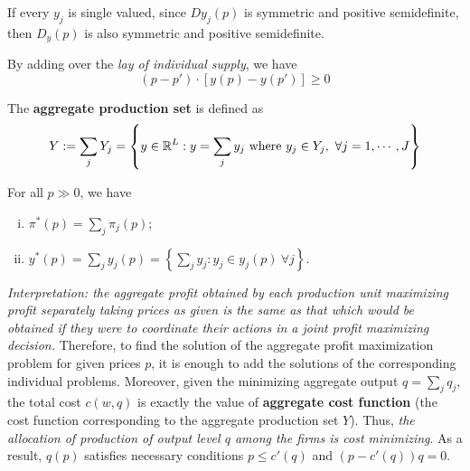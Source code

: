 \documentclass{report}
\begin{document}
	 		\begin{proposition}
	 			If every $y_j$ is single valued, since $Dy_j(p)$ is symmetric and positive semidefinite, then $D_y(p)$ is also symmetric and positive semidefinite.
	 		\end{proposition}
	 		
	 		\begin{proposition}
	 			By adding over the \emph{lay of individual supply}, we have 
	 			\begin{equation}
	 				(p-p') \cdot \left[y(p)-y(p')\right] \geq 0
	 			\end{equation}
	 		\end{proposition}
	 		
	 		\begin{definition}
	 			The \textbf{aggregate production set} is defined as
	 			\begin{equation}
	 				Y := \sum_j Y_j = \left\{y \in \mathbb{R}^L: y = \sum_j y_j \text{{ where }} y_j \in Y_j,\ \forall  j = 1, \cdots, J \right\}
	 			\end{equation}
	 		\end{definition}
	 		
	 		\begin{proposition}[5.E.1]
	 			For all $p \gg 0$, we have 
	 			\begin{enumerate}[(i)]
	 				\item $\pi^*(p) = \sum_j \pi_j (p)$;
	 				\item $y^*(p) = \sum_j y_j (p) = \left\{\sum_j y_j: y_j \in y_j(p)\ \forall j \right\}$.
	 			\end{enumerate}
	 			\emph{Interpretation: the aggregate profit obtained by each production unit maximizing profit separately taking prices as given is the same as that which would be obtained if they were to coordinate their actions in a joint profit maximizing decision.} Therefore, to find the solution of the aggregate profit maximization problem for given prices $p$, it is enough to add the solutions of the corresponding individual problems. Moreover, given the minimizing aggregate output $q = \sum_j q_j$, the total cost $c(w, q)$ is exactly the value of \textbf{aggregate cost function} (the cost function corresponding to the aggregate production set $Y$). Thus, \emph{the allocation of production of output level $q$ among the firms is cost minimizing}. As a result, $q(p)$ satisfies necessary conditions $p \leq c'(q)$ and $(p - c'(q))q = 0$.
	 		\end{proposition}
	 	
\end{document}

